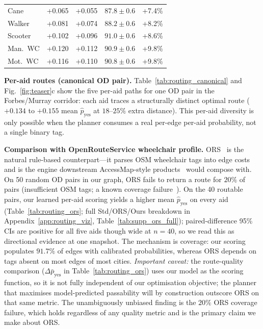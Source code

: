 \documentclass{article}
\begin{document}
\begin{table}[t]
\begin{minipage}[t]{0.31\linewidth}
\begin{tabular}{@{}lcccc@{}}
\midrule
Cane     & +0.065 & +0.055 & $87.8\pm0.6$ & +7.4\% \\
Walker   & +0.081 & +0.074 & $88.2\pm0.6$ & +8.2\% \\
Scooter  & +0.102 & +0.096 & $91.0\pm0.6$ & +8.6\% \\
Man.\ WC & +0.120 & +0.112 & $90.9\pm0.6$ & +9.8\% \\
Mot.\ WC & +0.116 & +0.110 & $90.8\pm0.6$ & +9.8\% \\
\bottomrule
\end{tabular}
\end{minipage}
\vspace{-4pt}
\end{table}

\textbf{Per-aid routes (canonical OD pair).} Table~\ref{tab:routing_canonical} and Fig.~\ref{fig:teaser}c show the five per-aid paths for one OD pair in the Forbes/Murray corridor: each aid traces a structurally distinct optimal route ($+0.134$ to $+0.155$ mean $\hat{p}_\mathrm{yes}$ at $18$--$25\%$ extra distance). This per-aid diversity is only possible when the planner consumes a real per-edge per-aid probability, not a single binary tag.

\textbf{Comparison with OpenRouteService wheelchair profile.} ORS~\citep{openrouteservice2026wheelchair} is the natural rule-based counterpart---it parses OSM wheelchair tags into edge costs and is the engine downstream AccessMap-style products~\citep{bolten2017accessmap,bolten2019opensidewalks,saha2022mypath} would compose with. On 50 random OD pairs in our graph, ORS fails to return a route for $20\%$ of pairs (insufficient OSM tags; a known coverage failure~\citep{tannert2018wheelchair}). On the 40 routable pairs, our learned per-aid scoring yields a higher mean $\hat{p}_\mathrm{yes}$ on every aid (Table~\ref{tab:routing_ors}; full Std/ORS/Ours breakdown in Appendix~\ref{app:routing_viz}, Table~\ref{tab:supp_ors_full}); paired-difference 95\% CIs are positive for all five aids though wide at $n{=}40$, so we read this as directional evidence at one snapshot. The mechanism is coverage: our scoring populates $91.7\%$ of edges with calibrated probabilities, whereas ORS depends on tags absent on most edges of most cities. \emph{Important caveat:} the route-quality comparison ($\Delta\bar{p}_\mathrm{yes}$ in Table~\ref{tab:routing_ors}) uses our model as the scoring function, so it is not fully independent of our optimisation objective; the planner that maximises model-predicted passability will by construction outscore ORS on that same metric. The unambiguously unbiased finding is the $20\%$ ORS coverage failure, which holds regardless of any quality metric and is the primary claim we make about ORS.
\end{document}
